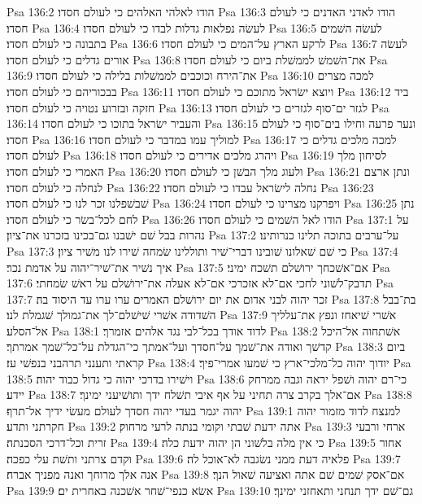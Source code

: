 Psa 136:2  הודו לאלהי האלהים כי לעולם חסדו׃
Psa 136:3  הודו לאדני האדנים כי לעולם חסדו׃
Psa 136:4  לעשׂה נפלאות גדלות לבדו כי לעולם חסדו׃
Psa 136:5  לעשׂה השׁמים בתבונה כי לעולם חסדו׃
Psa 136:6  לרקע הארץ על־המים כי לעולם חסדו׃
Psa 136:7  לעשׂה אורים גדלים כי לעולם חסדו׃
Psa 136:8  את־השׁמשׁ לממשׁלת ביום כי לעולם חסדו׃
Psa 136:9  את־הירח וכוכבים לממשׁלות בלילה כי לעולם חסדו׃
Psa 136:10  למכה מצרים בבכוריהם כי לעולם חסדו׃
Psa 136:11  ויוצא ישׂראל מתוכם כי לעולם חסדו׃
Psa 136:12  ביד חזקה ובזרוע נטויה כי לעולם חסדו׃
Psa 136:13  לגזר ים־סוף לגזרים כי לעולם חסדו׃
Psa 136:14  והעביר ישׂראל בתוכו כי לעולם חסדו׃
Psa 136:15  ונער פרעה וחילו בים־סוף כי לעולם חסדו׃
Psa 136:16  למוליך עמו במדבר כי לעולם חסדו׃
Psa 136:17  למכה מלכים גדלים כי לעולם חסדו׃
Psa 136:18  ויהרג מלכים אדירים כי לעולם חסדו׃
Psa 136:19  לסיחון מלך האמרי כי לעולם חסדו׃
Psa 136:20  ולעוג מלך הבשׁן כי לעולם חסדו׃
Psa 136:21  ונתן ארצם לנחלה כי לעולם חסדו׃
Psa 136:22  נחלה לישׂראל עבדו כי לעולם חסדו׃
Psa 136:23  שׁבשׁפלנו זכר לנו כי לעולם חסדו׃
Psa 136:24  ויפרקנו מצרינו כי לעולם חסדו׃
Psa 136:25  נתן לחם לכל־בשׂר כי לעולם חסדו׃
Psa 136:26  הודו לאל השׁמים כי לעולם חסדו׃
Psa 137:1  על נהרות בבל שׁם ישׁבנו גם־בכינו בזכרנו את־ציון׃
Psa 137:2  על־ערבים בתוכה תלינו כנרותינו׃
Psa 137:3  כי שׁם שׁאלונו שׁובינו דברי־שׁיר ותוללינו שׂמחה שׁירו לנו משׁיר ציון׃
Psa 137:4  איך נשׁיר את־שׁיר־יהוה על אדמת נכר׃
Psa 137:5  אם־אשׁכחך ירושׁלם תשׁכח ימיני׃
Psa 137:6  תדבק־לשׁוני לחכי אם־לא אזכרכי אם־לא אעלה את־ירושׁלם על ראשׁ שׂמחתי׃
Psa 137:7  זכר יהוה לבני אדום את יום ירושׁלם האמרים ערו ערו עד היסוד בה׃
Psa 137:8  בת־בבל השׁדודה אשׁרי שׁישׁלם־לך את־גמולך שׁגמלת לנו׃
Psa 137:9  אשׁרי שׁיאחז ונפץ את־עלליך אל־הסלע׃
Psa 138:1  לדוד אודך בכל־לבי נגד אלהים אזמרך׃
Psa 138:2  אשׁתחוה אל־היכל קדשׁך ואודה את־שׁמך על־חסדך ועל־אמתך כי־הגדלת על־כל־שׁמך אמרתך׃
Psa 138:3  ביום קראתי ותענני תרהבני בנפשׁי עז׃
Psa 138:4  יודוך יהוה כל־מלכי־ארץ כי שׁמעו אמרי־פיך׃
Psa 138:5  וישׁירו בדרכי יהוה כי גדול כבוד יהוה׃
Psa 138:6  כי־רם יהוה ושׁפל יראה וגבה ממרחק יידע׃
Psa 138:7  אם־אלך בקרב צרה תחיני על אף איבי תשׁלח ידך ותושׁיעני ימינך׃
Psa 138:8  יהוה יגמר בעדי יהוה חסדך לעולם מעשׂי ידיך אל־תרף׃
Psa 139:1  למנצח לדוד מזמור יהוה חקרתני ותדע׃
Psa 139:2  אתה ידעת שׁבתי וקומי בנתה לרעי מרחוק׃
Psa 139:3  ארחי ורבעי זרית וכל־דרכי הסכנתה׃
Psa 139:4  כי אין מלה בלשׁוני הן יהוה ידעת כלה׃
Psa 139:5  אחור וקדם צרתני ותשׁת עלי כפכה׃
Psa 139:6  פלאיה דעת ממני נשׂגבה לא־אוכל לה׃
Psa 139:7  אנה אלך מרוחך ואנה מפניך אברח׃
Psa 139:8  אם־אסק שׁמים שׁם אתה ואציעה שׁאול הנך׃
Psa 139:9  אשׂא כנפי־שׁחר אשׁכנה באחרית ים׃
Psa 139:10  גם־שׁם ידך תנחני ותאחזני ימינך׃

